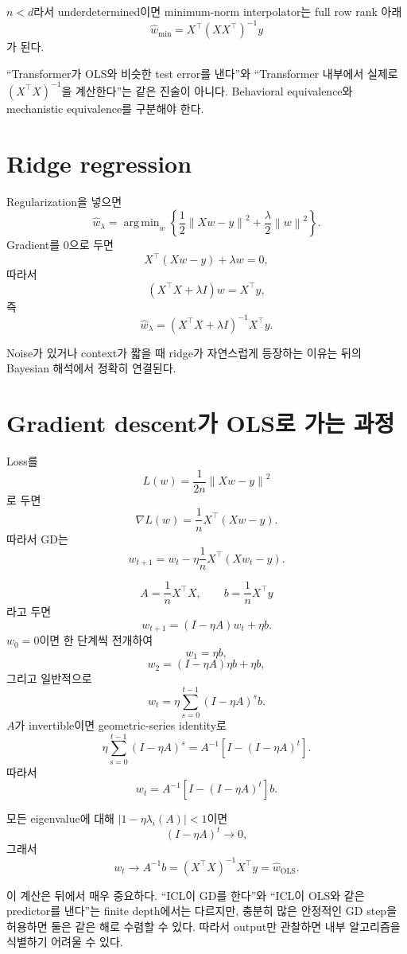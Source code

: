 \documentclass[11pt,a4paper,oneside,openany]{memoir}
\newcommand{\norm}[1]{\left\lVert #1\right\rVert}
\DeclareMathOperator*{\argmin}{arg\,min}
\theoremstyle{definition}
\begin{document}
$n<d$라서 underdetermined이면 minimum-norm interpolator는 full row rank 아래
\[
\hat w_{\mathrm{min}}=X^\top(XX^\top)^{-1}y
\]
가 된다.

\begin{warningbox}
``Transformer가 OLS와 비슷한 test error를 낸다''와 ``Transformer 내부에서 실제로 $(X^\top X)^{-1}$을 계산한다''는 같은 진술이 아니다. Behavioral equivalence와 mechanistic equivalence를 구분해야 한다.
\end{warningbox}

\section{Ridge regression}

Regularization을 넣으면
\[
\hat w_\lambda
=
\argmin_w
\left
\{
\frac12\norm{Xw-y}^2+\frac\lambda2\norm w^2
\right\}.
\]
Gradient를 0으로 두면
\[
X^\top(Xw-y)+\lambda w=0,
\]
따라서
\[
(X^\top X+\lambda I)w=X^\top y,
\]
즉
\[
\boxed{
\hat w_\lambda=(X^\top X+\lambda I)^{-1}X^\top y
}.
\]

Noise가 있거나 context가 짧을 때 ridge가 자연스럽게 등장하는 이유는 뒤의 Bayesian 해석에서 정확히 연결된다.

\section{Gradient descent가 OLS로 가는 과정}

Loss를
\[
L(w)=\frac{1}{2n}\norm{Xw-y}^2
\]
로 두면
\[
\nabla L(w)=\frac1nX^\top(Xw-y).
\]
따라서 GD는
\[
w_{t+1}
=w_t-\eta\frac1nX^\top(Xw_t-y).
\]

\[
A=\frac1nX^\top X,
\qquad
b=\frac1nX^\top y
\]
라고 두면
\[
w_{t+1}=(I-\eta A)w_t+\eta b.
\]
$w_0=0$이면 한 단계씩 전개하여
\[
w_1=\eta b,
\]
\[
w_2=(I-\eta A)\eta b+\eta b,
\]
그리고 일반적으로
\[
w_t
=\eta\sum_{s=0}^{t-1}(I-\eta A)^s b.
\]
$A$가 invertible이면 geometric-series identity로
\[
\eta\sum_{s=0}^{t-1}(I-\eta A)^s
=A^{-1}\left[I-(I-\eta A)^t\right].
\]
따라서
\[
\boxed{
w_t=A^{-1}\left[I-(I-\eta A)^t\right]b
}.
\]

모든 eigenvalue에 대해 $|1-\eta\lambda_i(A)|<1$이면
\[
(I-\eta A)^t\to0,
\]
그래서
\[
w_t\to A^{-1}b=(X^\top X)^{-1}X^\top y=\hat w_{\mathrm{OLS}}.
\]

\begin{suppbox}
이 계산은 뒤에서 매우 중요하다. ``ICL이 GD를 한다''와 ``ICL이 OLS와 같은 predictor를 낸다''는 finite depth에서는 다르지만, 충분히 많은 안정적인 GD step을 허용하면 둘은 같은 해로 수렴할 수 있다. 따라서 output만 관찰하면 내부 알고리즘을 식별하기 어려울 수 있다.
\end{suppbox}
\end{document}
